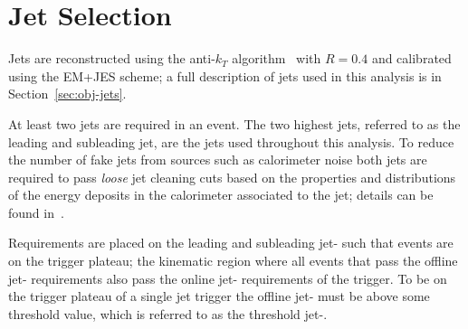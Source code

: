 %
%

\section{Jet Selection}
\label{sec:evt-sel-jets}

Jets are reconstructed using the anti-$k_T$ algorithm~\cite{obj-jets_reco_akt} with $R=0.4$
and calibrated using the EM+JES scheme;
a full description of jets used in this analysis is in Section~\ref{sec:obj-jets}.

At least two jets are required in an event.
The two highest \pT{} jets, referred to as the leading and subleading jet,
are the jets used throughout this analysis.
To reduce the number of fake jets from sources such as calorimeter noise
both jets are required to pass \textit{loose} jet cleaning cuts
based on the properties and distributions of the energy deposits in the calorimeter associated to the jet;
details can be found in~\cite{evt-jet_cleaning}.

Requirements are placed on  the leading and subleading jet-\pT{} such that events are on the trigger plateau;
the kinematic region where all events that pass the offline jet-\pT{} requirements
also pass the online jet-\pT{} requirements of the trigger.
To be on the trigger plateau of a single jet trigger the offline jet-\pT{} must be above some threshold value,
which is referred to as the threshold jet-\pT{}.

